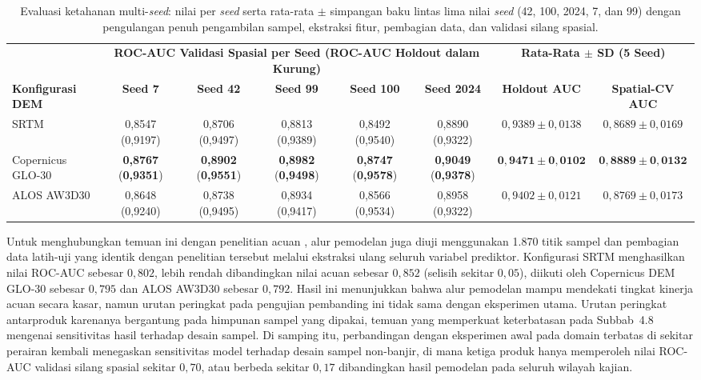 \documentclass[12pt]{article}
\begin{document}
\begin{table}[ht]
\small
\centering
\caption{Evaluasi ketahanan multi-\textit{seed}: nilai per \textit{seed} serta rata-rata $\pm$ simpangan baku lintas lima nilai \textit{seed} (42, 100, 2024, 7, dan 99) dengan pengulangan penuh pengambilan sampel, ekstraksi fitur, pembagian data, dan validasi silang spasial.}
\label{tab:multiseed}
\begin{adjustbox}{max width=\textwidth}
\begin{tabular}{l ccccc c c}
\toprule
& \multicolumn{5}{c}{\textbf{ROC-AUC Validasi Spasial per Seed (ROC-AUC Holdout dalam Kurung)}} & \multicolumn{2}{c}{\textbf{Rata-Rata $\pm$ SD (5 Seed)}} \\
\cmidrule(lr){2-6} \cmidrule(lr){7-8}
\textbf{Konfigurasi DEM} & \textbf{Seed 7} & \textbf{Seed 42} & \textbf{Seed 99} & \textbf{Seed 100} & \textbf{Seed 2024} & \textbf{Holdout AUC} & \textbf{Spatial-CV AUC} \\
\midrule
SRTM & 0,8547 (0,9197) & 0,8706 (0,9497) & 0,8813 (0,9389) & 0,8492 (0,9540) & 0,8890 (0,9322) & $0{,}9389 \pm 0{,}0138$ & $0{,}8689 \pm 0{,}0169$ \\
Copernicus GLO-30 & \textbf{0,8767} (\textbf{0,9351}) & \textbf{0,8902} (\textbf{0,9551}) & \textbf{0,8982} (\textbf{0,9498}) & \textbf{0,8747} (\textbf{0,9578}) & \textbf{0,9049} (\textbf{0,9378}) & $\mathbf{0{,}9471 \pm 0{,}0102}$ & $\mathbf{0{,}8889 \pm 0{,}0132}$ \\
ALOS AW3D30 & 0,8648 (0,9240) & 0,8738 (0,9495) & 0,8934 (0,9417) & 0,8566 (0,9534) & 0,8958 (0,9322) & $0{,}9402 \pm 0{,}0121$ & $0{,}8769 \pm 0{,}0173$ \\
\bottomrule
\end{tabular}
\end{adjustbox}
\end{table}

Untuk menghubungkan temuan ini dengan penelitian acuan \cite{hakim2026}, alur
pemodelan juga diuji menggunakan 1.870 titik sampel dan pembagian data
latih-uji yang identik dengan penelitian tersebut melalui ekstraksi ulang
seluruh variabel prediktor. Konfigurasi SRTM menghasilkan nilai ROC-AUC
sebesar $0{,}802$, lebih rendah dibandingkan nilai acuan sebesar $0{,}852$
(selisih sekitar $0{,}05$), diikuti oleh Copernicus DEM GLO-30 sebesar
$0{,}795$ dan ALOS AW3D30 sebesar $0{,}792$. Hasil ini menunjukkan bahwa alur
pemodelan mampu mendekati tingkat kinerja acuan secara kasar, namun urutan
peringkat pada pengujian pembanding ini tidak sama dengan eksperimen utama.
Urutan peringkat antarproduk karenanya bergantung pada himpunan sampel yang
dipakai, temuan yang memperkuat keterbatasan pada Subbab~4.8 mengenai
sensitivitas hasil terhadap desain sampel. Di samping itu, perbandingan
dengan eksperimen awal pada domain terbatas di sekitar perairan kembali
menegaskan sensitivitas model terhadap desain sampel
non-banjir, di mana ketiga produk hanya memperoleh nilai ROC-AUC validasi
silang spasial sekitar $0{,}70$, atau berbeda sekitar $0{,}17$ dibandingkan
hasil pemodelan pada seluruh wilayah kajian.
\end{document}
